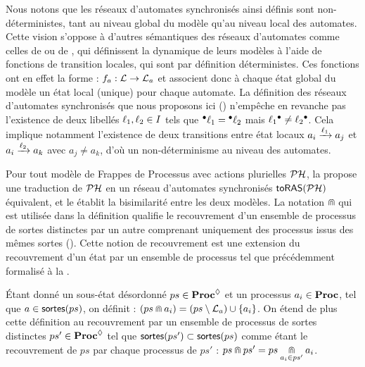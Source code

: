 \begin{remark}
  Nous notons que les réseaux d'automates synchronisés ainsi définis sont non-déterministes,
  tant au niveau global du modèle qu'au niveau local des automates.
  Cette vision s'oppose à d'autres sémantiques des réseaux d'automates
  comme celles de  ou de ,
  qui définissent la dynamique de leurs modèles à l'aide de fonctions de transition locales,
  qui sont par définition déterministes.
  Ces fonctions ont en effet la forme : $f_a : \ANl \rightarrow \ANl_a$
  et associent donc à chaque état global du modèle un état local (unique) pour chaque automate.
  La définition des réseaux d'automates synchronisés que nous proposons ici ()
  n'empêche en revanche pas l'existence de deux libellés $\ell_1, \ell_2 \in \ANi$
  tels que $\precond{\ell_1} = \precond{\ell_2}$ mais $\postcond{\ell_1} \neq \postcond{\ell_2}$.
  Cela implique notamment l'existence de deux transitions entre état locaux
  $\ANaction{a_i}{\ell_1}{a_j}$ et $\ANaction{a_i}{\ell_2}{a_k}$
  avec $a_j \neq a_k$, d'où un non-déterminisme au niveau des automates.
\end{remark}

Pour tout modèle de Frappes de Processus avec actions plurielles $\PH$,
la  propose une traduction de $\PH$
en un réseau d'automates synchronisés $\phmtoan[\PH]$ équivalent,
et le  établit la bisimilarité entre les deux modèles.
La notation $\recouvre$ qui est utilisée dans la définition
qualifie le recouvrement d'un ensemble de processus de sortes distinctes
par un autre comprenant uniquement des processus issus des mêmes sortes
().
Cette notion de recouvrement est une extension
du recouvrement d'un état par un ensemble de processus
tel que précédemment formalisé à la .

\begin{definition}
  Étant donné un sous-état désordonné $ps \in \PHsublset$ et un processus $a_i \in \Proc$,
  tel que $a \in \sortes{ps}$, on définit :
  $(ps \recouvre a_i) = (ps \setminus \PHl_a) \cup \{ a_i \}$.
  On étend de plus cette définition
  au recouvrement par un ensemble de processus de sortes distinctes
  $ps' \in \PHsublset$ tel que $\sortes{ps'} \subset \sortes{ps}$
  comme étant le recouvrement de $ps$ par chaque processus de $ps'$ :
  $ps \recouvre ps' = ps \underset{a_i \in ps'}{\recouvre} a_i$.
\end{definition}

